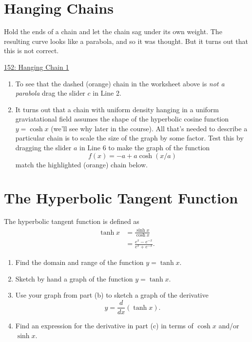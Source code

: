 \documentclass{ximera}
\begin{document}
\section{Hanging Chains}
Hold the ends of a chain and let the chain sag under its own weight. The resulting curve looks like a parabola, and so it was thought. But it turns out that this is not correct. 


\begin{onlineOnly}
    \begin{center}
\end{center}
\end{onlineOnly}

\href{https://www.desmos.com/calculator/tj3dz2cnf0}{152: Hanging Chain 1}


\begin{enumerate} 

\item To see that the dashed (orange) chain in the worksheet above is \emph{not a parabola} drag the slider $c$ in Line 2.

\item It turns out that a chain with uniform density hanging in a uniform graviatational field assumes the shape of the hyperbolic cosine function $y=\cosh x$ (we'll see why later in the course). All that's needed to describe a particular chain is to scale the size of the graph by some factor. Test this by dragging the slider $a$ in Line 6 to make the graph of the function
\[
     f(x) = -a + a\cosh(x/a)
\]
match the highlighted (orange) chain below.
\end{enumerate}

\section{The Hyperbolic Tangent Function}
The hyperbolic tangent function is defined as
\begin{align*}
 \tanh x &= \frac{\sinh x}{\cosh x}  \\
             &= \frac{e^x - e^{-x}}{e^x + e^{-x}}.
\end{align*}

\begin{enumerate}
\item Find the domain and range of the function $y=\tanh x$.

\item Sketch by hand a graph of the function $y=\tanh x$.

\item Use your graph from part (b) to sketch a graph of the derivative
\[
    y = \frac{d}{dx} \left( \tanh x \right) .
\]

\item Find an expression for the derivative in part (c) in terms of $\cosh x$ and/or  $\sinh x$. 

\end{enumerate}
\end{document}

